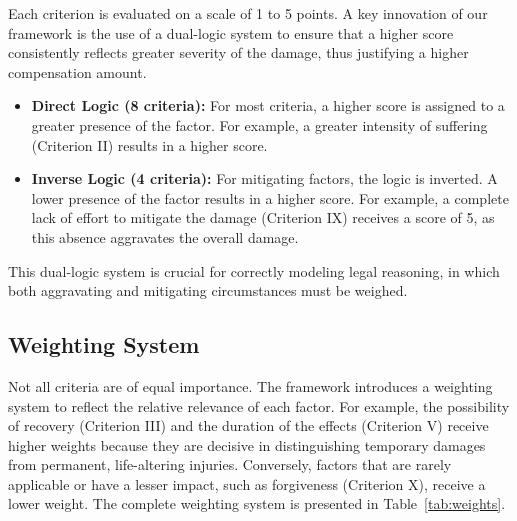 \documentclass[11pt,a4paper]{article}
\begin{document}
Each criterion is evaluated on a scale of 1 to 5 points. A key innovation of our framework is the use of a dual-logic system to ensure that a higher score consistently reflects greater severity of the damage, thus justifying a higher compensation amount.

\begin{itemize}
    \item \textbf{Direct Logic (8 criteria):} For most criteria, a higher score is assigned to a greater presence of the factor. For example, a greater intensity of suffering (Criterion II) results in a higher score.
    \item \textbf{Inverse Logic (4 criteria):} For mitigating factors, the logic is inverted. A lower presence of the factor results in a higher score. For example, a complete lack of effort to mitigate the damage (Criterion IX) receives a score of 5, as this absence aggravates the overall damage.
\end{itemize}

This dual-logic system is crucial for correctly modeling legal reasoning, in which both aggravating and mitigating circumstances must be weighed.

\subsection{Weighting System}

Not all criteria are of equal importance. The framework introduces a weighting system to reflect the relative relevance of each factor. For example, the possibility of recovery (Criterion III) and the duration of the effects (Criterion V) receive higher weights because they are decisive in distinguishing temporary damages from permanent, life-altering injuries. Conversely, factors that are rarely applicable or have a lesser impact, such as forgiveness (Criterion X), receive a lower weight. The complete weighting system is presented in Table~\ref{tab:weights}.
\end{document}
